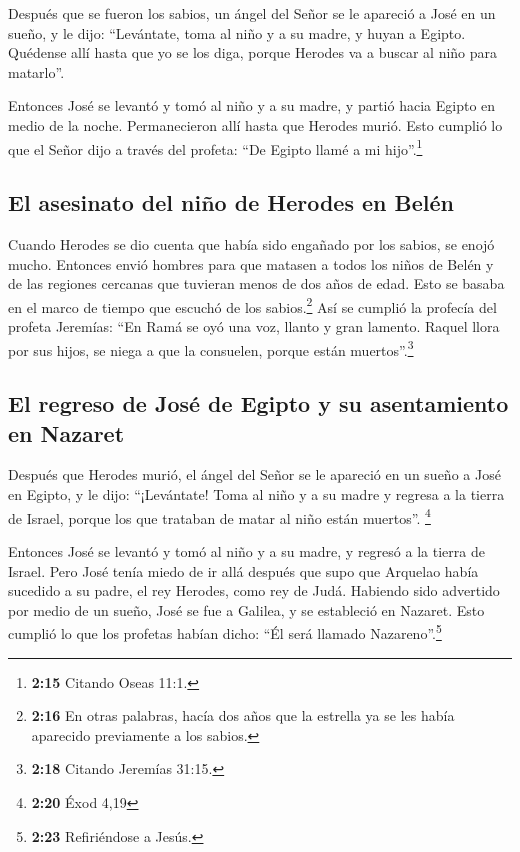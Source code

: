  Después que se fueron los sabios, un ángel del Señor se
le apareció a José en un sueño, y le dijo: ``Levántate, toma al niño y a
su madre, y huyan a Egipto. Quédense allí hasta que yo se los diga,
porque Herodes va a buscar al niño para matarlo''.

 Entonces José se levantó y tomó al niño y a su madre, y
partió hacia Egipto en medio de la noche.  Permanecieron
allí hasta que Herodes murió. Esto cumplió lo que el Señor dijo a través
del profeta: ``De Egipto llamé a mi hijo''.\footnote{\textbf{2:15}
  Citando Oseas 11:1.}

\hypertarget{el-asesinato-del-niuxf1o-de-herodes-en-beluxe9n}{%
\subsection{El asesinato del niño de Herodes en
Belén}\label{el-asesinato-del-niuxf1o-de-herodes-en-beluxe9n}}

 Cuando Herodes se dio cuenta que había sido engañado por
los sabios, se enojó mucho. Entonces envió hombres para que matasen a
todos los niños de Belén y de las regiones cercanas que tuvieran menos
de dos años de edad. Esto se basaba en el marco de tiempo que escuchó de
los sabios.\footnote{\textbf{2:16} En otras palabras, hacía dos años que
  la estrella ya se les había aparecido previamente a los sabios.}
 Así se cumplió la profecía del profeta Jeremías:
 ``En Ramá se oyó una voz, llanto y gran lamento. Raquel
llora por sus hijos, se niega a que la consuelen, porque están
muertos''.\footnote{\textbf{2:18} Citando Jeremías 31:15.}

\hypertarget{el-regreso-de-josuxe9-de-egipto-y-su-asentamiento-en-nazaret}{%
\subsection{El regreso de José de Egipto y su asentamiento en
Nazaret}\label{el-regreso-de-josuxe9-de-egipto-y-su-asentamiento-en-nazaret}}

 Después que Herodes murió, el ángel del Señor se le
apareció en un sueño a José en Egipto, y le dijo: 
``¡Levántate! Toma al niño y a su madre y regresa a la tierra de Israel,
porque los que trataban de matar al niño están muertos''. \footnote{\textbf{2:20}
  Éxod 4,19}

 Entonces José se levantó y tomó al niño y a su madre, y
regresó a la tierra de Israel.  Pero José tenía miedo de
ir allá después que supo que Arquelao había sucedido a su padre, el rey
Herodes, como rey de Judá. Habiendo sido advertido por medio de un
sueño, José se fue a Galilea,  y se estableció en
Nazaret. Esto cumplió lo que los profetas habían dicho: ``Él será
llamado Nazareno''.\footnote{\textbf{2:23} Refiriéndose a Jesús.}

